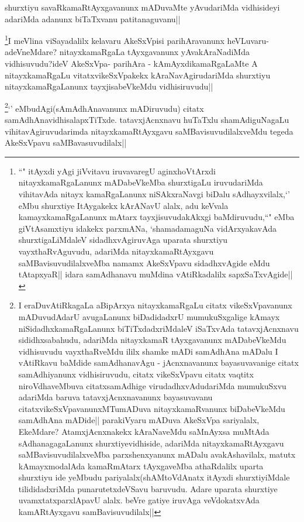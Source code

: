 
\begin{artha}
shurxtiyu savaRkamaRtAyxgavanunx mADuvaMte yAvudariMda vidhisideyi adariMda adanunx biTaTxvanu patitanaguvanu||
\end{artha}


\begin{artha}
\footnote{``\stext" itAyxdi yAgi jiVvitavu iruvavaregU aginxhoVtArxdi nitayxkamaRgaLanunx mADabeVkeMba shurxtigaLu iruvudariMda vihitavAda nitayx kamaRgaLanunx niSAkxraNavgi biDalu sAdhayxvilalx,`\stext' eMbu shurxtiye ItAygakekx kArANavU alalx, adu keVvala kamayxkamaRgaLanunx mAtarx tayxjisuvudakAkxgi baMdiruvudu,``\stext" eMba giVtAsamxtiyu idakekx parxmANa, `shamadamaguNa vidArxyakavAda shurxtigaLiMdaleV sidadhxvAgiruvAga uparata shurxtiyu vayxthaRvAguvudu, adariMda nitayxkamaRtAyxgavu saMBavisuvudilalxveMba namamx AkeSxVpavu sidadhxvAgide eMdu tAtapxyaR|| idara samAdhanavu muMdina vAtiRkadalilx sapxSaTxvAgide||}I meVlina viSayadalilx kelavaru AkeSxVpisi parihAravanunx heVLuvaru-adeVneMdare? nitayxkamaRgaLa tAyxgavanunx yAvakAraNadiMda vidhisuvudu?ideV AkeSxVpa- parihAra - kAmAyxdikamaRgaLaMte A nitayxkamaRgaLu vitatxvikeSxVpakekx kAraNavAgirudariMda shurxtiyu nitayxkamaRgaLanunx tayxjisabeVkeMdu vidhisiruvudu||
\end{artha}

\begin{artha}
\footnote{I eraDuvAtiRkagaLa aBipArxya nitayxkamaRgaLu citatx vikeSxVpavanunx mADuvudAdarU avugaLanunx biDadidadxrU mumukuSxgalige kAmayx niSidadhxkamaRgaLanunx biTiTxdadxriMdaleV iSaTxvAda tatavxjAcnxnavu sididhxsabahudu, adariMda nitayxkamaR tAyxgavanunx mADabeVkeMdu vidhisuvudu vayxthaRveMdu ililx shamke mADi samAdhAna  mADalu I vAtiRkavu baMdide samAdhanavAgu - jAcnxnavanunx bayasuvavanige citatx samAdhiyanunx vidhisiruvudu, citatx vikeSxVpavu citatx vaqtitx niroVdhaveMbuva citatxsamAdhige virudadhxvAdudariMda mumukuSxvu adariMda baruva tatavxjAcnxnavanunx bayasuvavanu citatxvikeSxVpavanunxMTumADuva nitayxkamaRvanunx biDabeVkeMdu samAdhAna mADide|| parakiVyaru mADuva AkeSxVpa sariyalalx, EkeMdare? AtamxjAcnxnakekx kAraNaveMdu saMnAyxsa muMtAda sAdhanagagaLanunx shurxtiyevidhiside, adariMda nitayxkamaRtAyxgavu saMBavisuvudilalxveMba parxshenxyanunx mADalu avakAshavilalx, matutx kAmayxmodalAda kamaRmAtarx tAyxgaveMba athaRdalilx uparta shurxtiyu ide yeMbudu pariyalalx(shAMtoVdAnatx itAyxdi shurxtiyiMdale tilididadxriMda punarutetxdeVSavu baruvudu. Adare uparata shurxtiye uvamxtatxparxlApavU alalx. beVre gatiye iruvAga veVdokatxvAda kamARtAyxgavu samBavisuvudilalx||}`\stext' eMbudAgi(sAmAdhAnavanunx mADiruvudu) citatx samAdhAnavidhisalapxTiTxde. tatavxjAcnxnavu huTaTxlu shamAdiguNagaLu vihitavAgiruvudarimda nitayxkamaRtAyxgavu saMBavisuvudilalxveMdu tegeda AkeSxVpavu saMBavasuvudilalx||
\end{artha}

